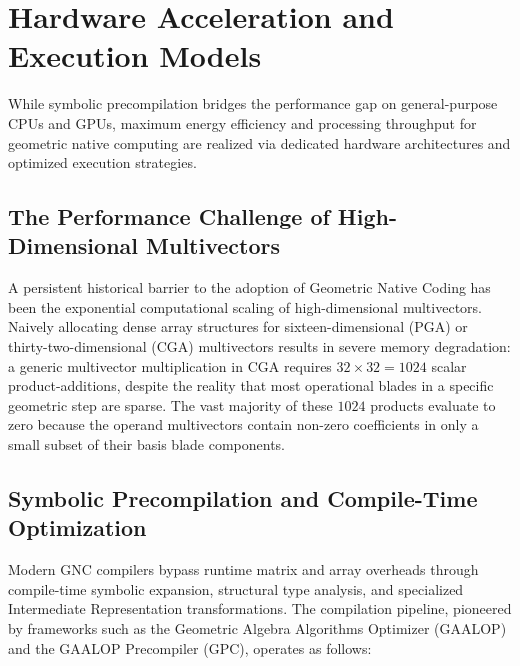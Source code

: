 \documentclass[manuscript, nonacm, review=false]{acmart}
\theoremstyle{definition}
\theoremstyle{plain}
\begin{document}

\section{Hardware Acceleration and Execution Models}
\label{sec:hardware}

While symbolic precompilation bridges the performance gap on general-purpose CPUs and GPUs, maximum energy efficiency and processing throughput for geometric native computing are realized via dedicated hardware architectures and optimized execution strategies.

\subsection{The Performance Challenge of High-Dimensional Multivectors}
\label{subsec:performance_challenge}

A persistent historical barrier to the adoption of Geometric Native Coding has been the exponential computational scaling of high-dimensional multivectors. Naively allocating dense array structures for sixteen-dimensional (PGA) or thirty-two-dimensional (CGA) multivectors results in severe memory degradation: a generic multivector multiplication in CGA requires $32 \times 32 = 1024$ scalar product-additions, despite the reality that most operational blades in a specific geometric step are sparse. The vast majority of these $1024$ products evaluate to zero because the operand multivectors contain non-zero coefficients in only a small subset of their basis blade components.


\subsection{Symbolic Precompilation and Compile-Time Optimization}
\label{subsec:symbolic_precompilation}

Modern GNC compilers bypass runtime matrix and array overheads through compile-time symbolic expansion, structural type analysis, and specialized Intermediate Representation transformations. The compilation pipeline, pioneered by frameworks such as the Geometric Algebra Algorithms Optimizer (GAALOP) and the GAALOP Precompiler (GPC), operates as follows:
\end{document}
